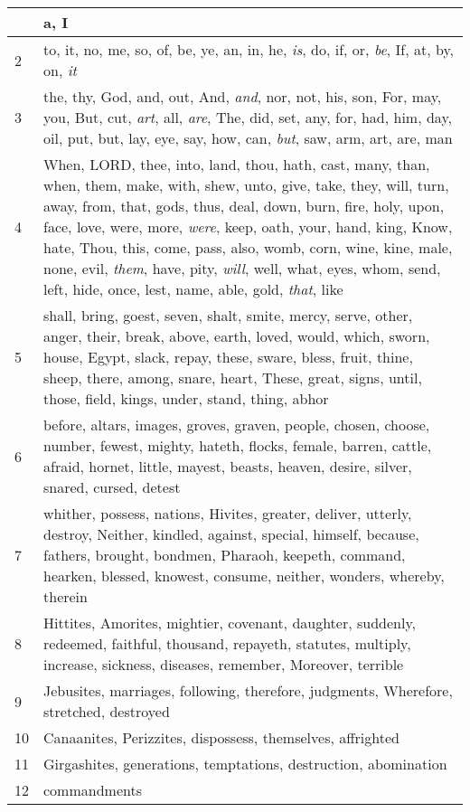 \begin{longtable}{l|p{3.75in}}
\hline \hline
\endlastfoot
1 & a, I \\ \hline
2 & to, it, no, me, so, of, be, ye, an, in, he, \emph{is}, do, if, or, \emph{be}, If, at, by, on, \emph{it} \\ \hline
3 & the, thy, God, and, out, And, \emph{and}, nor, not, his, son, For, may, you, But, cut, \emph{art}, all, \emph{are}, The, did, set, any, for, had, him, day, oil, put, but, lay, eye, say, how, can, \emph{but}, saw, arm, art, are, man \\ \hline
4 & When, LORD, thee, into, land, thou, hath, cast, many, than, when, them, make, with, shew, unto, give, take, they, will, turn, away, from, that, gods, thus, deal, down, burn, fire, holy, upon, face, love, were, more, \emph{were}, keep, oath, your, hand, king, Know, hate, Thou, this, come, pass, also, womb, corn, wine, kine, male, none, evil, \emph{them}, have, pity, \emph{will}, well, what, eyes, whom, send, left, hide, once, lest, name, able, gold, \emph{that}, like \\ \hline
5 & shall, bring, goest, seven, shalt, smite, mercy, serve, other, anger, their, break, above, earth, loved, would, which, sworn, house, Egypt, slack, repay, these, sware, bless, fruit, thine, sheep, there, among, snare, heart, These, great, signs, until, those, field, kings, under, stand, thing, abhor \\ \hline
6 & before, altars, images, groves, graven, people, chosen, choose, number, fewest, mighty, hateth, flocks, female, barren, cattle, afraid, hornet, little, mayest, beasts, heaven, desire, silver, snared, cursed, detest \\ \hline
7 & whither, possess, nations, Hivites, greater, deliver, utterly, destroy, Neither, kindled, against, special, himself, because, fathers, brought, bondmen, Pharaoh, keepeth, command, hearken, blessed, knowest, consume, neither, wonders, whereby, therein \\ \hline
8 & Hittites, Amorites, mightier, covenant, daughter, suddenly, redeemed, faithful, thousand, repayeth, statutes, multiply, increase, sickness, diseases, remember, Moreover, terrible \\ \hline
9 & Jebusites, marriages, following, therefore, judgments, Wherefore, stretched, destroyed \\ \hline
10 & Canaanites, Perizzites, dispossess, themselves, affrighted \\ \hline
11 & Girgashites, generations, temptations, destruction, abomination \\ \hline
12 & commandments \\ \hline
\end{longtable}






